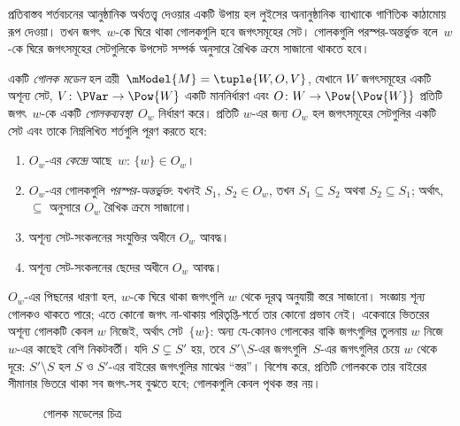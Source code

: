 \documentclass[../../../include/open-logic-section]{subfiles}
\begin{document}


প্রতিবাস্তব শর্তবচনের আনুষ্ঠানিক অর্থতত্ত্ব দেওয়ার একটি উপায় হল
লুইসের অনানুষ্ঠানিক ব্যাখ্যাকে গাণিতিক কাঠামোয় রূপ দেওয়া। তখন
জগৎ~$w$-কে ঘিরে থাকা গোলকগুলি হবে জগৎসমূহের সেট। গোলকগুলি
পরস্পর-অন্তর্ভুক্ত বলে~$w$-কে ঘিরে জগৎসমূহের সেটগুলিকে উপসেট
সম্পর্ক অনুসারে রৈখিক ক্রমে সাজানো থাকতে হবে।

\begin{defn}
  একটি \emph{গোলক মডেল} হল ত্রয়ী~$\mModel{M} = \tuple{W, O, V}$,
  যেখানে $W$ জগৎসমূহের একটি অশূন্য সেট, $V\colon \PVar \to \Pow{W}$
  একটি মাননির্ধারণ এবং $O\colon W \to \Pow{\Pow{W}}$ প্রতিটি
  জগৎ~$w$-কে একটি \emph{গোলকব্যবস্থা}~$O_w$ নির্ধারণ করে। প্রতিটি
  $w$-এর জন্য $O_w$ হল জগৎসমূহের সেটগুলির একটি সেট এবং তাকে
  নিম্নলিখিত শর্তগুলি পূরণ করতে হবে:
  \begin{enumerate}
  \item $O_w$-এর \emph{কেন্দ্রে} আছে~$w$: $\{w\} \in O_w$।
  \item $O_w$-এর গোলকগুলি \emph{পরস্পর-অন্তর্ভুক্ত}: যখনই $S_1$,
    $S_2 \in O_w$, তখন $S_1 \subseteq S_2$ অথবা $S_2 \subseteq S_1$;
    অর্থাৎ, $\subseteq$ অনুসারে $O_w$ রৈখিক ক্রমে সাজানো।
  \item অশূন্য সেট-সংকলনের সংযুক্তির অধীনে $O_w$ আবদ্ধ।
  \item অশূন্য সেট-সংকলনের ছেদের অধীনে $O_w$ আবদ্ধ।
  \end{enumerate}
\end{defn}

$O_w$-এর পিছনের ধারণা হল, $w$-কে ঘিরে থাকা জগৎগুলি
$w$ থেকে দূরত্ব অনুযায়ী স্তরে সাজানো।
সংজ্ঞায় শূন্য গোলকও থাকতে পারে; এতে কোনো জগৎ না-থাকায়
পরিতৃপ্তি-শর্তে তার কোনো প্রভাব নেই। একেবারে ভিতরের অশূন্য গোলকটি কেবল $w$
নিজেই, অর্থাৎ সেট~$\{w\}$: অন্য যে-কোনও গোলকের বাকি জগৎগুলির
তুলনায় $w$ নিজে~$w$-এর কাছেই বেশি নিকটবর্তী। যদি $S \subsetneq S'$
হয়, তবে $S' \setminus S$-এর জগৎগুলি~$S$-এর জগৎগুলির চেয়ে
$w$ থেকে দূরে: $S' \setminus S$ হল $S$ ও $S'$-এর বাইরের জগৎগুলির
মাঝের ``স্তর''। বিশেষ করে, প্রতিটি গোলককে তার বাইরের সীমানার
ভিতরে থাকা সব জগৎ-সহ বুঝতে হবে; গোলকগুলি কেবল পৃথক স্তর নয়।

\begin{figure}
\begin{center}
\caption{গোলক মডেলের চিত্র}
\end{center}
\end{figure}
\end{document}
